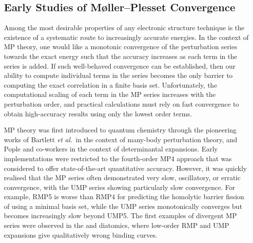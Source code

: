 \documentclass[aps,prb,reprint,noshowkeys,superscriptaddress]{revtex4-1}
\newcommand{\etal}{\textit{et al.}}
\begin{document}
\subsection{Early Studies of M{\o}ller--Plesset Convergence} %

 Among the most desirable properties of any electronic structure technique is the existence of 
a systematic route to increasingly accurate energies. 
In the context of MP theory, one would like a monotonic convergence of the perturbation
series towards the exact energy such that the accuracy increases as each term in the series is added.
If such well-behaved convergence can be established, then our ability to compute individual 
terms in the series becomes the only barrier to computing the exact correlation in a finite basis set.
Unfortunately, the computational scaling of each term in the MP series increases with the perturbation
order, and practical calculations must rely on fast convergence
to obtain high-accuracy results using only the lowest order terms.

MP theory was first introduced to quantum chemistry through the pioneering
works of Bartlett \etal\ in the context of many-body perturbation theory,\cite{Bartlett_1975}
and Pople and co-workers in the context of determinantal expansions.\cite{Pople_1976,Pople_1978}
Early implementations were restricted to the fourth-order MP4 approach that was considered
to offer state-of-the-art quantitative accuracy.\cite{Pople_1978,Krishnan_1980}
However, it was quickly realised that the MP series often demonstrated very slow, oscillatory, 
or erratic convergence, with the UMP series showing particularly slow convergence.\cite{Laidig_1985,Knowles_1985,Handy_1985}
For example, RMP5 is worse than RMP4 for predicting the homolytic barrier fission of  using a minimal basis set, 
while the UMP series monotonically converges but becomes increasingly slow beyond UMP5.\cite{Gill_1986}
The first examples of divergent MP series were observed in the  and  
diatomics, where low-order RMP and UMP expansions give qualitatively wrong binding curves.\cite{Laidig_1987} 
\end{document}
